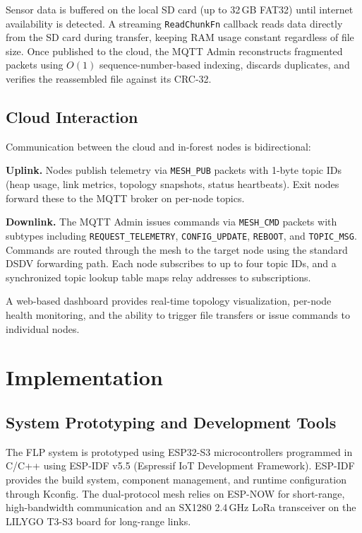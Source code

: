 \documentclass[conference]{IEEEtran}
\begin{document}
Sensor data is buffered on the local SD card (up to 32\,GB FAT32) until internet availability is detected. A streaming \texttt{ReadChunkFn} callback reads data directly from the SD card during transfer, keeping RAM usage constant regardless of file size. Once published to the cloud, the MQTT Admin reconstructs fragmented packets using $O(1)$ sequence-number-based indexing, discards duplicates, and verifies the reassembled file against its CRC-32.

\subsection{Cloud Interaction}

Communication between the cloud and in-forest nodes is bidirectional:

\textbf{Uplink.} Nodes publish telemetry via \texttt{MESH\_PUB} packets with 1-byte topic IDs (heap usage, link metrics, topology snapshots, status heartbeats). Exit nodes forward these to the MQTT broker on per-node topics.

\textbf{Downlink.} The MQTT Admin issues commands via \texttt{MESH\_CMD} packets with subtypes including \texttt{REQUEST\_TELEMETRY}, \texttt{CONFIG\_UPDATE}, \texttt{REBOOT}, and \texttt{TOPIC\_MSG}. Commands are routed through the mesh to the target node using the standard DSDV forwarding path. Each node subscribes to up to four topic IDs, and a synchronized topic lookup table maps relay addresses to subscriptions.

A web-based dashboard provides real-time topology visualization, per-node health monitoring, and the ability to trigger file transfers or issue commands to individual nodes.

\section{Implementation}
\label{sec:implementation}

\subsection{System Prototyping and Development Tools}

The FLP system is prototyped using ESP32-S3 microcontrollers programmed in C/C++ using ESP-IDF v5.5 (Espressif IoT Development Framework). ESP-IDF provides the build system, component management, and runtime configuration through Kconfig. The dual-protocol mesh relies on ESP-NOW for short-range, high-bandwidth communication and an SX1280 2.4\,GHz LoRa transceiver on the LILYGO T3-S3 board for long-range links.
\end{document}
